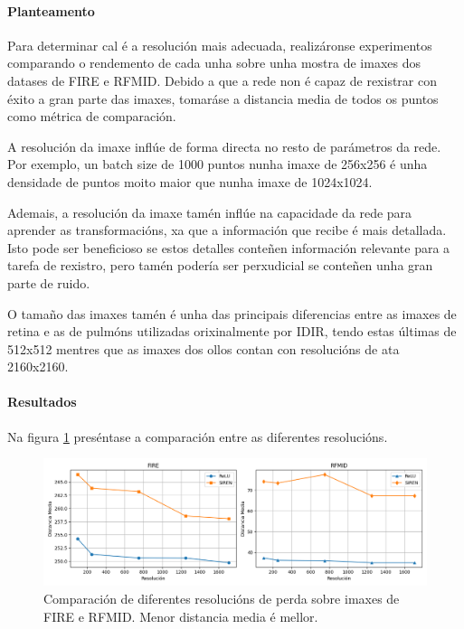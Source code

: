 \paragraph{Planteamento}
\label{par:Planteamento-resolution}


Para determinar cal é a resolución mais adecuada, realizáronse experimentos comparando o rendemento de cada unha sobre unha mostra de imaxes dos datases de FIRE e RFMID.
Debido a que a rede non é capaz de rexistrar con éxito a gran parte das imaxes, tomaráse a distancia media de todos os puntos como métrica de comparación.

A resolución da imaxe inflúe de forma directa no resto de parámetros da rede.
Por exemplo, un batch size de 1000 puntos nunha imaxe de 256x256 é unha densidade de puntos moito maior que nunha imaxe de 1024x1024.

Ademais, a resolución da imaxe tamén inflúe na capacidade da rede para aprender as transformacións, xa que a información que recibe é mais detallada. 
Isto pode ser beneficioso se estos detalles conteñen información relevante para a tarefa de rexistro, pero tamén podería ser perxudicial se conteñen unha gran parte de ruido.

O tamaño das imaxes tamén é unha das principais diferencias entre as imaxes de retina e as de pulmóns utilizadas orixinalmente por IDIR, tendo estas últimas de 512x512 mentres que as imaxes dos ollos contan con resolucións de ata 2160x2160.

\paragraph{Resultados}
\label{par:Resultados-resolution}

Na figura \ref{fig:resoluciónchart} preséntase a comparación entre as diferentes resolucións.

\begin{figure}[ht]
    \centering
    \includegraphics[width=1\textwidth]{imaxes/resolutionchart.png}
    \caption{Comparación de diferentes resolucións de perda sobre imaxes de FIRE e RFMID. Menor distancia media é mellor.}
    \label{fig:resoluciónchart}
\end{figure}

